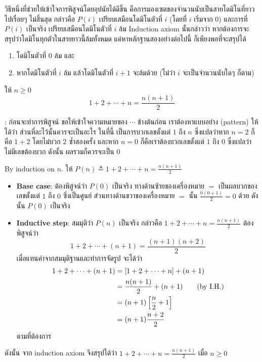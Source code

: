 วิธีหนึ่งที่ช่วยให้เข้าใจการพิสูจน์โดยอุปนัยได้ดีขึ้น คือการมองเซตของจำนวนนับเป็นสายโดมิโนที่ยาวไปเรื่อยๆ ไม่สิ้นสุด กล่าวคือ $P(i)$ เปรียบเสมือนโดมิโนตัวที่ $i$ (โดยที่ $i$ เริ่มจาก $0$) และการที่ $P(i)$ เป็นจริง เปรียบเสมือนโดมิโนตัวที่ $i$ ล้ม \enskip Induction axiom นั้นกล่าวว่า หากต้องการจะสรุปว่าโดมิโนทุกตัวในสายยาวนี้ล้มทั้งหมด แค่หาหลักฐานสองอย่างต่อไปนี้ ก็เพียงพอที่จะสรุปได้
\begin{enumerate}
\item โดมิโนตัวที่ $0$ ล้ม และ
\item หากโดมิโนตัวที่ $i$ ล้ม แล้วโดมิโนตัวที่ $i+1$ จะล้มด้วย (ไม่ว่า $i$ จะเป็นจำนวนนับใดๆ ก็ตาม)
\end{enumerate}

\begin{theorem}\label{thm:sum-n}
ให้ $n\geq 0$
\[1+2+\cdots+n=\frac{n(n+1)}{2}\]

: ก่อนจะทำการพิสูจน์ ขอให้เข้าใจความหมายของ $\cdots$ ข้างต้นก่อน \enskip เราต้องหาแบบอย่าง (pattern) ให้ได้ว่า ส่วนที่ละไว้นั้นควรจะเป็นอะไร \enskip ในที่นี้ เป็นการบวกเลขตั้งแต่ $1$ ถึง $n$ ซึ่งแปลว่าหาก $n=2$ ก็คือ $1+2$ โดยไม่บวก $2$ ซ้ำสองครั้ง และหาก $n=0$ ก็คือเราต้องบวกเลขตั้งแต่ $1$ ถึง $0$ ซึ่งแปลว่าไม่มีเลขต้องบวก ดังนั้น ผลรวมก็ควรจะเป็น $0$
\begin{pf}
By induction on $n$.  ให้ $P(n)\triangleq 1+2+\cdots+n=\frac{n(n+1)}{2}$
\begin{itemize}
\item {\bf Base case}: ต้องพิสูจน์ว่า $P(0)$ เป็นจริง \enskip ทางด้านซ้ายของเครื่องหมาย $=$ เป็นผลบวกของเลขตั้งแต่ $1$ ถึง $0$ ซึ่งเป็นศูนย์ ส่วนทางด้านขวาของเครื่องหมาย $=$ นั้น $\frac{0(0+1)}{2}=0$ ด้วย \enskip ดังนั้น $P(0)$ เป็นจริง \quad\yea
\item {\bf Inductive step}: สมมุติว่า $P(n)$ เป็นจริง กล่าวคือ $1+2+\cdots+n=\frac{n(n+1)}{2}$ ต้องพิสูจน์ว่า \[1+2+\cdots+(n+1)=\frac{(n+1)(n+2)}{2}\] เมื่อแทนค่าจากสมมุติฐานและทำการจัดรูป จะได้ว่า
\begin{align*}
1+2+\cdots+(n+1)
&=\left[1+2+\cdots+n\right]+(n+1) \\
&=\frac{n(n+1)}{2}+(n+1) \qquad\textup{(by I.H.)} \\
&=(n+1)\left[\frac{n}{2}+1\right] \\
&=(n+1)\frac{n+2}{2}
\end{align*}
ตามที่ต้องการ \quad\yea
\end{itemize}
ดังนั้น จาก induction axiom จึงสรุปได้ว่า $1+2+\cdots+n=\frac{n(n+1)}{2}$ เมื่อ $n\geq 0$
\end{pf}
\end{theorem}

